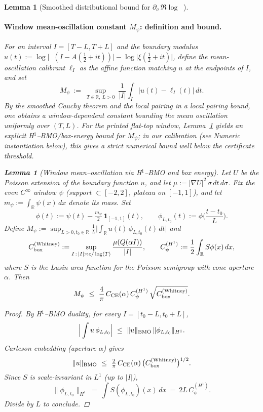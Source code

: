 \documentclass[11pt]{article}
\newtheorem{lemma}[theorem]{Lemma}
\theoremstyle{definition}
\theoremstyle{remark}
\newcommand{\R}{\mathbb{R}}
\DeclareMathOperator{\dettwo}{det_2}
\begin{document}
\begin{lemma}[Smoothed distributional bound for $\partial_\sigma\,\Re\log\dettwo$]
\paragraph{Window mean-oscillation constant \(M_\psi\): definition and bound.}
For an interval \(I=[T{-}L,T{+}L]\) and the boundary modulus \(u(t):=\log\big|\dettwo(I{-}A(\tfrac12{+}it))\big|{-}\log\big|\xi(\tfrac12{+}it)\big|\), define the mean-oscillation calibrant \(\ell_I\) as the affine function matching \(u\) at the endpoints of \(I\), and set
\[
  M_\psi\ :=\ \sup_{T\in\R,\ L>0}\ \frac{1}{|I|}\int_I \big|u(t)-\ell_I(t)\big|\,dt.
\]
By the smoothed Cauchy theorem and the local pairing in a local pairing bound, one obtains a window-dependent constant bounding the mean oscillation uniformly over $(T,L)$. For the printed flat-top window, Lemma~\ref{lem:Mpsi-correct} yields an explicit H$^1$--BMO/box-energy bound for $M_\psi$; in our calibration (see Numeric instantiation below), this gives a strict numerical bound well below the certificate threshold.
\begin{lemma}[Window mean--oscillation via H$^1$--BMO and box energy]\label{lem:Mpsi-correct}
Let $U$ be the Poisson extension of the boundary function $u$, and let $\mu := |\nabla U|^2\,\sigma\,dt\,d\sigma$.
Fix the even $C^\infty$ window $\psi$ (support $\subset[-2,2]$, plateau on $[-1,1]$), and let $m_\psi:=\int_{\R}\psi(x)\,dx$ denote its mass. Set
\[
\phi(t):=\psi(t)-\tfrac{m_\psi}{2}\,\mathbf 1_{[-1,1]}(t),\qquad 
\phi_{L,t_0}(t):=\phi\!\Big(\frac{t-t_0}{L}\Big).
\]
Define $M_\psi:=\sup_{L>0,t_0\in\R}\frac1L\big|\int_\R u(t)\,\phi_{L,t_0}(t)\,dt\big|$ and
\[
C_{\rm box}^{(\mathrm{Whitney})}:=\sup_{I\,:\,|I|\asymp c/\log\langle T\rangle}\frac{\mu(Q(\alpha I))}{|I|},\qquad
C_\psi^{(H^1)}:=\frac12\int_{\R} S\phi(x)\,dx,
\]
where $S$ is the Lusin area function for the Poisson semigroup with cone aperture $\alpha$.
Then
\[
M_\psi\ \le\ \frac{4}{\pi}\,C_{\mathrm{CE}}(\alpha)\,C_\psi^{(H^1)}\,\sqrt{C_{\rm box}^{(\mathrm{Whitney})}}.
\]
\end{lemma}
\begin{proof}
By H$^1$--BMO duality, for every $I=[t_0-L,t_0+L]$,
\[ \Big|\int u\,\phi_{L,t_0}\Big|\ \le\ \|u\|_{\rm BMO}\,\|\phi_{L,t_0}\|_{H^1}. \]
Carleson embedding (aperture $\alpha$) gives
\[ \|u\|_{\rm BMO}\ \le\ \tfrac{2}{\pi}\,C_{\mathrm{CE}}(\alpha)\,\big(C_{\rm box}^{(\mathrm{Whitney})}\big)^{1/2}. \]
Since $S$ is scale-invariant in $L^1$ (up to $|I|$),
\[ \|\phi_{L,t_0}\|_{H^1}\ =\ \int S(\phi_{L,t_0})(x)\,dx\ =\ 2L\,C_\psi^{(H^1)}. \]
Divide by $L$ to conclude.
\end{proof}

\end{lemma}
\end{document}
